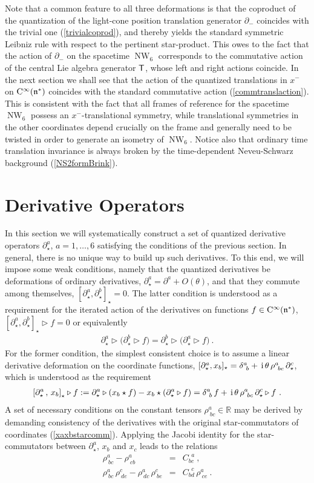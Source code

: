 \documentclass[11pt,a4paper]{article}
\DeclareMathOperator{\NW}{NW}
\newcommand{\1}{\mathbb{1}}
\def\ii{{\,{\rm i}\,}}
\def\CC{{\rm C}}
\def\T{{\sf T}}
\def\mfn{{\mathfrak n}}
\newcommand{\newsection}{\setcounter{equation}{0}\section}
\newcommand{\real}{{\mathbb R}} %
\def\bea{\begin{eqnarray}}
\newcommand{\beq}{\begin{eqnarray}}
\newcommand{\eeq}{\end{eqnarray}}
\begin{document}
Note that a common feature to all three deformations is that the coproduct
of the quantization of the light-cone position translation generator
$\partial_-$ coincides with the trivial one (\ref{trivialcoprod}), and
thereby yields the standard symmetric Leibniz rule with respect to the
pertinent star-product. This owes to the fact that the action of
$\partial_-$ on the spacetime $\NW_6$ corresponds to the commutative
action of the central Lie algebra generator $\T$, whose left and right actions
coincide. In the next section we shall see that the action of the
quantized translations in $x^-$ on $\CC^\infty(\mfn^*)$ coincides with
the standard commutative action (\ref{commtranslaction}). This is
consistent with the fact that all frames of reference for the
spacetime $\NW_6$ possess an $x^-$-translational symmetry, while
translational symmetries in the other coordinates depend crucially on
the frame and generally need to be twisted in order to generate an
isometry of $\NW_6$. Notice also that ordinary time translation
invariance is always broken by the time-dependent Neveu-Schwarz
background (\ref{NS2formBrink}).

\newsection{Derivative Operators \label{Derivatives}}

In this section we will systematically construct a set of quantized
derivative operators $\partial^a_\star$, $a=1,\dots,6$ satisfying the
conditions of the previous section. In general, there is no unique way
to build up such derivatives. To this end, we will impose some weak
conditions, namely that the quantized derivatives be deformations of
ordinary derivatives, $\partial_\star^a=\partial^a+O(\theta)$, and
that they commute among themselves,
$[\partial_\star^a,\partial_\star^b]_\star=0$. The latter condition is
understood as a requirement for the iterated action of the derivatives
on functions $f\in\CC^\infty(\mfn^*)$,
$[\partial_\star^a,\partial_\star^b]_\star\triangleright f=0$ or
equivalently
\beq
\partial_\star^a\triangleright\bigl(\partial_\star^b\triangleright f
\bigr)=\partial_\star^b\triangleright\bigl(\partial_\star^a\triangleright
f\bigr) \ . 
\label{derivcommute}\eeq
For the former condition, the simplest consistent choice is to assume
a linear derivative deformation on the coordinate functions,
$[\partial_\star^a,x_b]_\star=
\delta^a_{~b}+\ii\theta\,\rho^a_{~bc}\,\partial^c_\star$, which is
understood as the requirement
\beq
\left[\partial_\star^a\,,\,x_b\right]_\star\triangleright f:=
\partial^a_\star\triangleright\left(x_b\star f\right)-
x_b\star\left(\partial_\star^a\triangleright f\right)=
\delta^a_{~b}\,f+\ii\theta\,\rho^a_{~bc}\,\partial^c_\star
\triangleright f \ .
\label{dxreq}\eeq
A set of necessary conditions on the constant tensors
$\rho^a_{~bc}\in\real$ may be derived by demanding consistency of the
derivatives with the original star-commutators of coordinates
(\ref{xaxbstarcomm}). Applying the Jacobi identity for the
star-commutators between $\partial^a_\star$, $x_b$ and $x_c$ leads to
the relations
\bea
\rho^a_{~bc}-\rho^a_{~cb}&=&C_{bc}^{~~a} \ , \nonumber\\
\rho^a_{~bc}\,\rho^c_{~de}-\rho^a_{~dc}\,\rho^c_{~be}&=&
C_{bd}^{~~c}\,\rho^a_{~ce} \ .
\label{rhoCrels}\eeq
\end{document}
